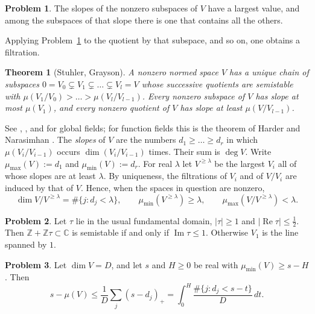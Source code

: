 \documentclass[reqno]{amsart}
\theoremstyle{definition}
\newtheorem{problem}{Problem}[section]
\theoremstyle{plain}
\newtheorem{theorem}{Theorem}[section]
\newcommand{\Z}{\mathbb{Z}}
\newcommand{\C}{\mathbb{C}}
\newcommand{\mumax}{\mu_{\max}}
\newcommand{\mumin}{\mu_{\min}}
\begin{document}
\begin{problem}\label{pr:destab}
The slopes of the nonzero subspaces of \(V\) have a largest value, and among the subspaces of that slope there is one that contains all the others.
\end{problem}

Applying Problem~\ref{pr:destab} to the quotient by that subspace, and so on, one obtains a filtration.

\begin{theorem}[Stuhler, Grayson]\label{thm:hn}
A nonzero normed space \(V\) has a unique chain of subspaces \(0 = V_0 \subsetneq V_1 \subsetneq \dots \subsetneq V_l = V\) whose successive quotients are semistable with \(\mu(V_1/V_0) > \dots > \mu(V_l/V_{l-1})\).  Every nonzero subspace of \(V\) has slope at most \(\mu(V_1)\), and every nonzero quotient of \(V\) has slope at least \(\mu(V/V_{l-1})\).
\end{theorem}

See \cite{St}, \cite{Gr}, and \cite{Ga} for global fields; for function fields this is the theorem of Harder and Narasimhan \cite{HN}.  The \emph{slopes} of \(V\) are the numbers \(d_1 \ge \dots \ge d_r\) in which \(\mu(V_i/V_{i-1})\) occurs \(\dim(V_i/V_{i-1})\) times.  Their sum is \(\deg V\).  Write \(\mumax(V) := d_1\) and \(\mumin(V) := d_r\).  For real \(\lambda\) let \(V^{\ge\lambda}\) be the largest \(V_i\) all of whose slopes are at least \(\lambda\).  By uniqueness, the filtrations of \(V_i\) and of \(V/V_i\) are induced by that of \(V\).  Hence, when the spaces in question are nonzero,
\begin{equation}\label{eq:trunc}
  \dim V/V^{\ge\lambda} = \#\{j : d_j < \lambda\} , \qquad \mumin(V^{\ge\lambda}) \ge \lambda , \qquad \mumax(V/V^{\ge\lambda}) < \lambda .
\end{equation}

\begin{problem}\label{pr:tau}
Let \(\tau\) lie in the usual fundamental domain, \(\lvert \tau \rvert \ge 1\) and \(\lvert \operatorname{Re}\tau \rvert \le \tfrac12\).  Then \(\Z + \Z\tau \subset \C\) is semistable if and only if \(\operatorname{Im}\tau \le 1\).  Otherwise \(V_1\) is the line spanned by \(1\).
\end{problem}

\begin{problem}\label{pr:layer}
Let \(\dim V = D\), and let \(s\) and \(H \ge 0\) be real with \(\mumin(V) \ge s - H\).  Then
\[
  s - \mu(V) \le \frac1D \sum_j (s - d_j)_+ = \int_0^H \frac{\#\{j : d_j < s - t\}}{D} \, d t .
\]
\end{problem}
\end{document}
